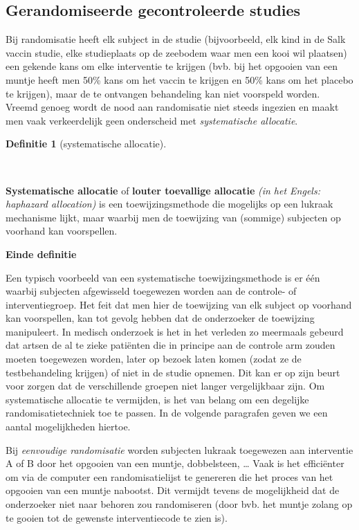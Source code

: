 \documentclass[
  dutch,
  letterpaper,
  12pt]{book}
\theoremstyle{definition}
\theoremstyle{definition}
\newtheorem{definition}{Definitie}[chapter]
\theoremstyle{definition}
\theoremstyle{remark}
\begin{document}
\subsection{Gerandomiseerde gecontroleerde
studies}\label{gerandomiseerde-gecontroleerde-studies}

Bij randomisatie heeft elk subject in de studie (bijvoorbeeld, elk kind
in de Salk vaccin studie, elke studieplaats op de zeebodem waar men een
kooi wil plaatsen) een gekende kans om elke interventie te krijgen (bvb.
bij het opgooien van een muntje heeft men 50\% kans om het vaccin te
krijgen en 50\% kans om het placebo te krijgen), maar de te ontvangen
behandeling kan niet voorspeld worden. Vreemd genoeg wordt de nood aan
randomisatie niet steeds ingezien en maakt men vaak verkeerdelijk geen
onderscheid met \emph{systematische allocatie}.

\begin{definition}[systematische
allocatie]\protect\hypertarget{def-systematische-allocatie}{}\label{def-systematische-allocatie}

~

\end{definition}

\textbf{Systematische allocatie} of \textbf{louter toevallige allocatie}
\emph{(in het Engels: haphazard allocation)} is een toewijzingsmethode
die mogelijks op een lukraak mechanisme lijkt, maar waarbij men de
toewijzing van (sommige) subjecten op voorhand kan voorspellen.

\textbf{Einde definitie}

Een typisch voorbeeld van een systematische toewijzingsmethode is er één
waarbij subjecten afgewisseld toegewezen worden aan de controle- of
interventiegroep. Het feit dat men hier de toewijzing van elk subject op
voorhand kan voorspellen, kan tot gevolg hebben dat de onderzoeker de
toewijzing manipuleert. In medisch onderzoek is het in het verleden zo
meermaals gebeurd dat artsen de al te zieke patiënten die in principe
aan de controle arm zouden moeten toegewezen worden, later op bezoek
laten komen (zodat ze de testbehandeling krijgen) of niet in de studie
opnemen. Dit kan er op zijn beurt voor zorgen dat de verschillende
groepen niet langer vergelijkbaar zijn. Om systematische allocatie te
vermijden, is het van belang om een degelijke randomisatietechniek toe
te passen. In de volgende paragrafen geven we een aantal mogelijkheden
hiertoe.

Bij \emph{eenvoudige randomisatie} worden subjecten lukraak toegewezen
aan interventie A of B door het opgooien van een muntje, dobbelsteen,
\ldots{} Vaak is het efficiënter om via de computer een
randomisatielijst te genereren die het proces van het opgooien van een
muntje nabootst. Dit vermijdt tevens de mogelijkheid dat de onderzoeker
niet naar behoren zou randomiseren (door bvb. het muntje zolang op te
gooien tot de gewenste interventiecode te zien is).
\end{document}
